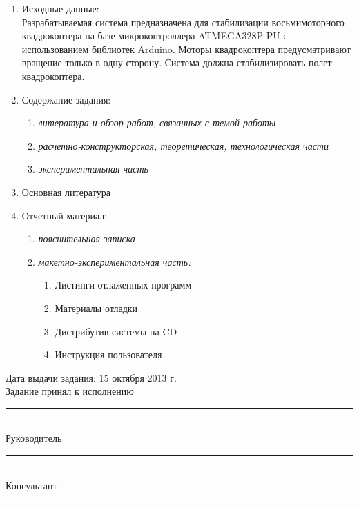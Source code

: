 \begin{enumerate}
	\item Исходные данные:
	\mbox{}\\Разрабатываемая система предназначена для стабилизации восьмимоторного квадрокоптера на базе микроконтроллера ATMEGA328P-PU с использованием библиотек Arduino. Моторы квадрокоптера предусматривают вращение только в одну сторону. Система должна стабилизировать полет квадрокоптера.
	\item Содержание задания:
	\begin{enumerate}
		\item\itshape литература и обзор работ, связанных с темой работы
		\item\itshape расчетно-конструкторская, теоретическая, технологическая части
		\item\itshape экспериментальная часть
	\end{enumerate}
	\item Основная литература
	\item Отчетный материал:
		\begin{enumerate}
		\item{\itshape пояснительная записка}
		\item{\itshape макетно-экспериментальная часть:}
			\begin{enumerate}
			\item Листинги отлаженных программ
			\item Материалы отладки
			\item Дистрибутив системы на CD
			\item Инструкция пользователя
			\end{enumerate}
		\end{enumerate}
\end{enumerate}
\vfill %
\begin{center}
	\begin{minipage}[b]{12cm}
		\begin{flushleft}
		Дата выдачи задания: 15 октября 2013 г. \\
		Задание принял к исполнению \rule{3cm}{0.4pt} \\
		Руководитель \rule{6cm}{0.4pt} \\
		Консультант \rule{6cm}{0.4pt} \\
		\end{flushleft}
	\end{minipage}
\end{center}